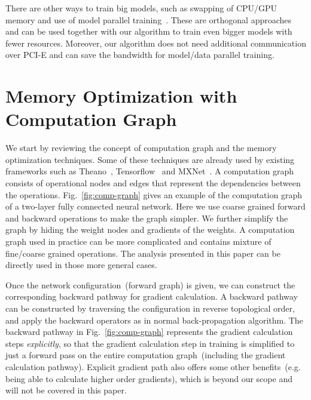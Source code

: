 \documentclass{article} %
\newcommand{\presec}{\vspace*{-2pt}}
\newcommand{\postsec}{\vspace*{-2pt}} %
\begin{document}
There are other ways to train big models, such as swapping of CPU/GPU memory and use of model parallel training~\cite{GoogleDisbelief, rhu2016virtualizing}.
These are orthogonal approaches and can be used together with our algorithm to train even bigger models with fewer resources.
Moreover, our algorithm does not need additional communication over PCI-E and can save the bandwidth for model/data parallel training.

\presec
\section{Memory Optimization with Computation Graph}\label{sec:comp-graph}
\postsec

We start by reviewing the concept of computation graph and the memory optimization techniques.
Some of these techniques are already used by existing frameworks such as Theano~\cite{bergstra+al:2010-scipy,Bastien-Theano-2012}, Tensorflow~\cite{tensorflow2015-whitepaper} and MXNet~\cite{MXNet-whitepaper}.
A computation graph consists of operational nodes and edges that represent the dependencies between the operations.
Fig.~\ref{fig:comp-graph} gives an example of the computation graph of a two-layer fully connected
neural network.
Here we use coarse grained forward and backward operations to make the graph simpler.
We further simplify the graph by hiding the weight nodes and gradients of the weights.
A computation graph used in practice can be more complicated and contains mixture of fine/coarse grained operations.
The analysis presented in this paper can be directly used in those more general cases.

Once the network configuration~(forward graph) is given, we can construct the corresponding backward pathway for gradient calculation.
A backward pathway can be constructed by traversing the configuration in reverse topological order, and apply the backward operators as in normal back-propagation algorithm.
The backward pathway in Fig.~\ref{fig:comp-graph} represents the gradient calculation steps \emph{explicitly}, so that the gradient calculation step in training is simplified to just a forward pass on the entire computation graph~(including the gradient calculation pathway).
Explicit gradient path also offers some other benefits~(e.g. being able to calculate higher order gradients), which is beyond our scope and will not be covered in this paper.
\end{document}
